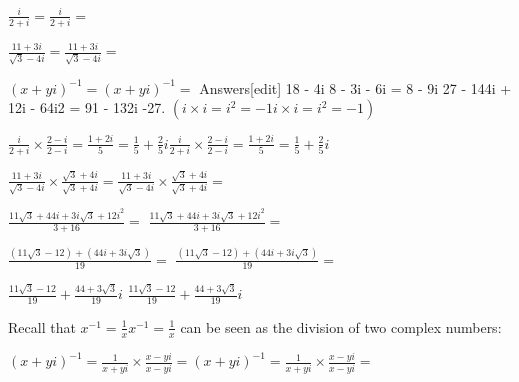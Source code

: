 \documentclass[12pt, a4paper]{report}
\theoremstyle{plain}
\theoremstyle{definition}
\theoremstyle{remark}
\begin{document}
${\displaystyle {\frac {i}{2+i}}=} {\displaystyle {\frac {i}{2+i}}=}$

${\displaystyle {\frac {11+3i}{{\sqrt {3}}-4i}}=} {\displaystyle {\frac {11+3i}{{\sqrt {3}}-4i}}=}$

${\displaystyle {(x+yi)}^{-1}=} {\displaystyle {(x+yi)}^{-1}=}$
Answers[edit]
18 - 4i
8 - 3i - 6i = 8 - 9i
27 - 144i + 12i - 64i2 = 91 - 132i
-27. $( {\displaystyle i\times i=i^{2}=-1} {\displaystyle i\times i=i^{2}=-1})$

${\displaystyle {\frac {i}{2+i}}\times {\frac {2-i}{2-i}}={\frac {1+2i}{5}}={\frac {1}{5}}+{\frac {2}{5}}i} {\displaystyle {\frac {i}{2+i}}\times {\frac {2-i}{2-i}}={\frac {1+2i}{5}}={\frac {1}{5}}+{\frac {2}{5}}i}$

${\displaystyle {\frac {11+3i}{{\sqrt {3}}-4i}}\times {\frac {{\sqrt {3}}+4i}{{\sqrt {3}}+4i}}=} {\displaystyle {\frac {11+3i}{{\sqrt {3}}-4i}}\times {\frac {{\sqrt {3}}+4i}{{\sqrt {3}}+4i}}=}$

${\displaystyle {\frac {11{\sqrt {3}}+44i+3i{\sqrt {3}}+12i^{2}}{3+16}}=}$ ${\displaystyle {\frac {11{\sqrt {3}}+44i+3i{\sqrt {3}}+12i^{2}}{3+16}}=}$

${\displaystyle {\frac {(11{\sqrt {3}}-12)+(44i+3i{\sqrt {3}})}{19}}=}$ ${\displaystyle {\frac {(11{\sqrt {3}}-12)+(44i+3i{\sqrt {3}})}{19}}=}$

${\displaystyle {\frac {11{\sqrt {3}}-12}{19}}+{\frac {44+3{\sqrt {3}}}{19}}i}$ 
${\displaystyle {\frac {11{\sqrt {3}}-12}{19}}+{\frac {44+3{\sqrt {3}}}{19}}i}$


Recall that ${\displaystyle x^{-1}={\frac {1}{x}}} {\displaystyle x^{-1}={\frac {1}{x}}}$ can be seen as the division of two complex numbers:

${\displaystyle {(x+yi)}^{-1}={\frac {1}{x+yi}}\times {\frac {x-yi}{x-yi}}=} {\displaystyle {(x+yi)}^{-1}={\frac {1}{x+yi}}\times {\frac {x-yi}{x-yi}}=}$
\end{document}
